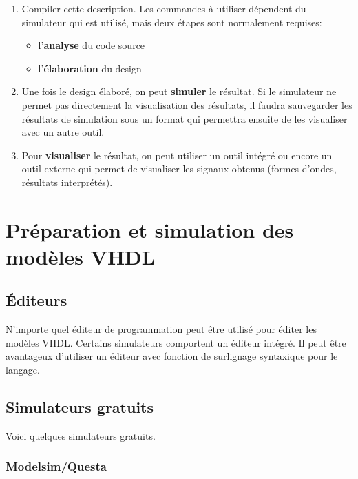 \documentclass[11pt]{article}
\begin{document}
\begin{enumerate}
\item Compiler cette description. Les commandes à utiliser dépendent du
simulateur qui est utilisé, mais deux étapes sont normalement
requises:
\begin{itemize}
\item l'\textbf{analyse} du code source
\item l'\textbf{élaboration} du design
\end{itemize}

\item Une fois le design élaboré, on peut \textbf{simuler} le résultat. Si le
simulateur ne permet pas directement la visualisation des
résultats, il faudra sauvegarder les résultats de simulation sous un
format qui permettra ensuite de les visualiser avec un autre outil.

\item Pour \textbf{visualiser} le résultat, on peut utiliser un outil intégré ou encore un
outil externe qui permet de visualiser les signaux obtenus (formes d'ondes,
résultats interprétés).
\end{enumerate}

\section{Préparation et simulation des modèles VHDL}
\label{sec:orgda3726c}

\subsection{Éditeurs}
\label{sec:org0ef67ff}

N'importe quel éditeur de programmation peut être utilisé pour éditer
les modèles VHDL. Certains simulateurs comportent un éditeur
intégré. Il peut être avantageux d'utiliser un éditeur avec fonction
de surlignage syntaxique pour le langage.

\subsection{Simulateurs gratuits}
\label{sec:orgd4ff76c}

Voici quelques simulateurs gratuits. 

\subsubsection{Modelsim/Questa}
\label{sec:orgfb63a91}
\end{document}
